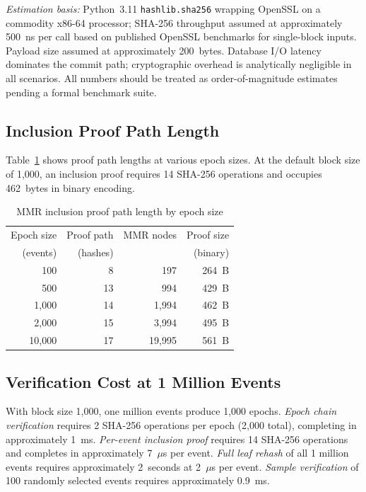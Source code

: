 \documentclass[sigconf,natbib=false]{acmart}
\begin{document}
\textit{Estimation basis:} Python~3.11 \texttt{hashlib.sha256} wrapping
OpenSSL on a commodity x86-64 processor; SHA-256 throughput assumed at
approximately 500~ns per call based on published OpenSSL benchmarks for
single-block inputs. Payload size assumed at approximately 200~bytes.
Database I/O latency dominates the commit path; cryptographic overhead is
analytically negligible in all scenarios. All numbers should be treated as
order-of-magnitude estimates pending a formal benchmark suite.

\subsection{Inclusion Proof Path Length}

Table~\ref{tab:proof} shows proof path lengths at various epoch sizes. At
the default block size of 1,000, an inclusion proof requires 14 SHA-256
operations and occupies 462~bytes in binary encoding.

\begin{table}[ht]
\caption{MMR inclusion proof path length by epoch size}
\label{tab:proof}
\begin{tabular}{rrrr}
\toprule
Epoch size & Proof path & MMR nodes & Proof size \\
(events) & (hashes) & & (binary) \\
\midrule
100   & 8  & 197    & 264~B \\
500   & 13 & 994    & 429~B \\
1,000 & 14 & 1,994  & 462~B \\
2,000 & 15 & 3,994  & 495~B \\
10,000 & 17 & 19,995 & 561~B \\
\bottomrule
\end{tabular}
\end{table}

\subsection{Verification Cost at 1 Million Events}

With block size 1,000, one million events produce 1,000 epochs.
\textit{Epoch chain verification} requires 2 SHA-256 operations per epoch
(2,000 total), completing in approximately 1~ms. \textit{Per-event inclusion
proof} requires 14 SHA-256 operations and completes in approximately 7~$\mu$s
per event. \textit{Full leaf rehash} of all 1 million events requires
approximately 2~seconds at 2~$\mu$s per event. \textit{Sample verification}
of 100 randomly selected events requires approximately 0.9~ms.
\end{document}
